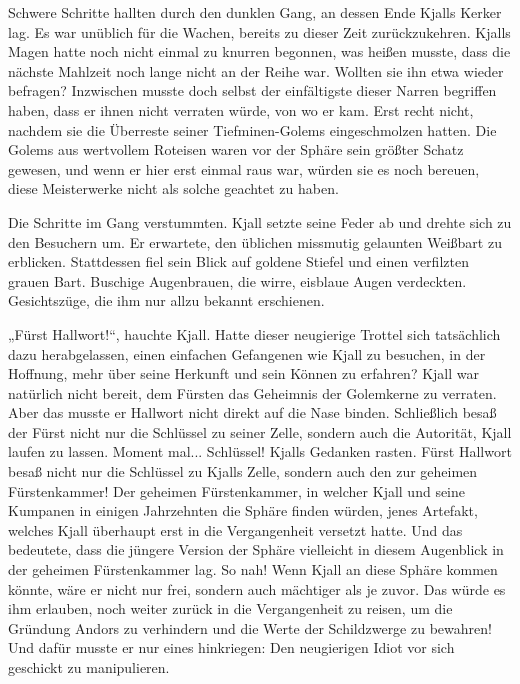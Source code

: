 \trennzeichen



Schwere Schritte hallten durch den dunklen Gang, an dessen Ende Kjalls Kerker lag. Es war unüblich für die Wachen, bereits zu dieser Zeit zurückzukehren. Kjalls Magen hatte noch nicht einmal zu knurren begonnen, was heißen musste, dass die nächste Mahlzeit noch lange nicht an der Reihe war. Wollten sie ihn etwa wieder befragen? Inzwischen musste doch selbst der einfältigste dieser Narren begriffen haben, dass er ihnen nicht verraten würde, von wo er kam. Erst recht nicht, nachdem sie die Überreste seiner Tiefminen-Golems eingeschmolzen hatten. Die Golems aus wertvollem Roteisen waren vor der Sphäre sein größter Schatz gewesen, und wenn er hier erst einmal raus war, würden sie es noch bereuen, diese Meisterwerke nicht als solche geachtet zu haben.

Die Schritte im Gang verstummten. Kjall setzte seine Feder ab und drehte sich zu den Besuchern um. Er erwartete, den üblichen missmutig gelaunten Weißbart zu erblicken. Stattdessen fiel sein Blick auf goldene Stiefel und einen verfilzten grauen Bart. Buschige Augenbrauen, die wirre, eisblaue Augen verdeckten. Gesichtszüge, die ihm nur allzu bekannt erschienen.

„Fürst Hallwort!“, hauchte Kjall. Hatte dieser neugierige Trottel sich tatsächlich dazu herabgelassen, einen einfachen Gefangenen wie Kjall zu besuchen, in der Hoffnung, mehr über seine Herkunft und sein Können zu erfahren? Kjall war natürlich nicht bereit, dem Fürsten das Geheimnis der Golemkerne zu verraten. Aber das musste er Hallwort nicht direkt auf die Nase binden. Schließlich besaß der Fürst nicht nur die Schlüssel zu seiner Zelle, sondern auch die Autorität, Kjall laufen zu lassen. Moment mal... Schlüssel! Kjalls Gedanken rasten. Fürst Hallwort besaß nicht nur die Schlüssel zu Kjalls Zelle, sondern auch den zur geheimen Fürstenkammer! Der geheimen Fürstenkammer, in welcher Kjall und seine Kumpanen in einigen Jahrzehnten die Sphäre finden würden, jenes Artefakt, welches Kjall überhaupt erst in die Vergangenheit versetzt hatte. Und das bedeutete, dass die jüngere Version der Sphäre vielleicht in diesem Augenblick in der geheimen Fürstenkammer lag. So nah! Wenn Kjall an diese Sphäre kommen könnte, wäre er nicht nur frei, sondern auch mächtiger als je zuvor. Das würde es ihm erlauben, noch weiter zurück in die Vergangenheit zu reisen, um die Gründung Andors zu verhindern und die Werte der Schildzwerge zu bewahren! Und dafür musste er nur eines hinkriegen: Den neugierigen Idiot vor sich geschickt zu manipulieren.

